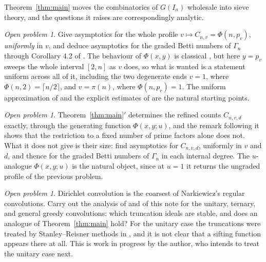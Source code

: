 \documentclass[a4paper,11pt,oneside,reqno]{amsart}
\theoremstyle{definition}
\theoremstyle{remark}
\newtheorem{openproblem}[definition]{Open problem}
\theoremstyle{plain}
\newcommand{\Gam}{\Gamma}
\begin{document}
Theorem~\ref{thm:main} moves the combinatorics of \(G(I_n)\) wholesale into
sieve theory, and the questions it raises are correspondingly analytic.

\begin{openproblem}
  Give asymptotics for the whole profile \(v\mapsto C_{n,v} = \Phi(n,p_v)\),
  \emph{uniformly} in \(v\), and deduce asymptotics for the graded Betti
  numbers of \(\Gam_n\) through Corollary 4.2 of \cite{Snellman2000}. The
  behaviour of \(\Phi(x,y)\) is classical \cite{Buchstab,deBruijn,Tenenbaum},
  but here \(y = p_v\) sweeps the whole interval \([2,n]\) as \(v\) does, so what
  is wanted is a statement uniform across all of it, including the two
  degenerate ends \(v = 1\), where \(\Phi(n,2) = \lceil n/2\rceil\), and
  \(v = \pi(n)\), where \(\Phi(n,p_{r}) = 1\). The uniform approximation of
  \cite{deBruijn} and the explicit estimates of \cite{Fan} are the natural
  starting points.
\end{openproblem}

\begin{openproblem}
  Theorem~\ref{thm:main}\({}'\) determines the refined counts \(C_{n,v,d}\)
  exactly, through the generating function \(\Phi(x,y;u)\), and the remark
  following it shows that the restriction to a fixed number of prime factors
  alone does not. What it does not give is their size: find
  asymptotics for \(C_{n,v,d}\), uniformly in \(v\) and \(d\), and thence for
  the graded Betti numbers of \(\Gam_n\) in each internal degree. The
  \(u\)-analogue \(\Phi(x,y;u)\) is the natural object, since at \(u = 1\) it
  returns the ungraded profile of the previous problem.
\end{openproblem}

\begin{openproblem}
  Dirichlet convolution is the coarsest of Narkiewicz's regular convolutions.
  Carry out the analysis of \cite{Snellman2000} and of this note for the
  unitary, ternary, and general greedy convolutions: which truncation ideals are
  stable, and does an analogue of Theorem~\ref{thm:main} hold? For the unitary
  case the truncations were treated by Stanley--Reisner methods in
  \cite{SnellmanUnitaryGeneral,SnellmanUnitaryN}, and it is not clear that a
  sifting function
  appears there at all. This is work in progress by the author, who intends to
  treat the unitary case next.
\end{openproblem}
\end{document}
